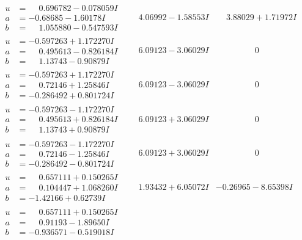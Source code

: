 \documentclass[1p]{elsarticle_modified}
\theoremstyle{definition}
\begin{document}
$$\begin{array}{c|c|c}
\begin{aligned}
u &= \phantom{-}0.696782 - 0.078059 I \\
a &= -0.68685 - 1.60178 I \\
b &= \phantom{-}1.055880 - 0.547593 I\end{aligned}
 & \phantom{-}4.06992 - 1.58553 I & \phantom{-}3.88029 + 1.71972 I \\ \hline\begin{aligned}
u &= -0.597263 + 1.172270 I \\
a &= \phantom{-}0.495613 - 0.826184 I \\
b &= \phantom{-}1.13743 - 0.90879 I\end{aligned}
 & \phantom{-}6.09123 - 3.06029 I & \phantom{-0.000000 } 0 \\ \hline\begin{aligned}
u &= -0.597263 + 1.172270 I \\
a &= \phantom{-}0.72146 + 1.25846 I \\
b &= -0.286492 + 0.801724 I\end{aligned}
 & \phantom{-}6.09123 - 3.06029 I & \phantom{-0.000000 } 0 \\ \hline\begin{aligned}
u &= -0.597263 - 1.172270 I \\
a &= \phantom{-}0.495613 + 0.826184 I \\
b &= \phantom{-}1.13743 + 0.90879 I\end{aligned}
 & \phantom{-}6.09123 + 3.06029 I & \phantom{-0.000000 } 0 \\ \hline\begin{aligned}
u &= -0.597263 - 1.172270 I \\
a &= \phantom{-}0.72146 - 1.25846 I \\
b &= -0.286492 - 0.801724 I\end{aligned}
 & \phantom{-}6.09123 + 3.06029 I & \phantom{-0.000000 } 0 \\ \hline\begin{aligned}
u &= \phantom{-}0.657111 + 0.150265 I \\
a &= \phantom{-}0.104447 + 1.068260 I \\
b &= -1.42166 + 0.62739 I\end{aligned}
 & \phantom{-}1.93432 + 6.05072 I & -0.26965 - 8.65398 I \\ \hline\begin{aligned}
u &= \phantom{-}0.657111 + 0.150265 I \\
a &= \phantom{-}0.91193 - 1.89650 I \\
b &= -0.936571 - 0.519018 I\end{aligned}

\end{array}$$
\end{document}
